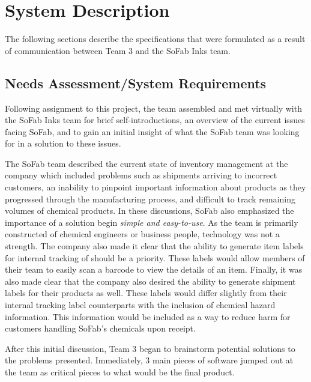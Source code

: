\documentclass{article}
\begin{document}
\section{System Description}
The following sections describe the specifications that were formulated as a result of communication between Team 3 and the SoFab Inks
team. 
\subsection{Needs Assessment\slash System Requirements}
Following assignment to this project, the team assembled and met virtually with the SoFab Inks team for brief self-introductions, 
an overview of the current issues facing SoFab, and to gain an initial insight of what the SoFab team was looking for in a
solution to these issues. 

The SoFab team described the current state of inventory management at the company which included problems such as shipments arriving 
to incorrect customers, an inability to pinpoint important information about products as they progressed through the manufacturing 
process, and difficult to track remaining volumes of chemical products. In these discussions, SoFab also emphasized the importance 
of a solution begin \textit{simple and easy-to-use}. As the team is primarily constructed of chemical engineers or business people, 
technology was not a strength. The company also made it clear that the ability to generate item labels for internal tracking of 
should be a priority. These labels would allow members of their team to easily scan a barcode to view the details of an item. Finally, 
it was also made clear that the company also desired the ability to generate shipment labels for their products as well. These labels 
would differ slightly from their internal tracking label counterparts with the inclusion of chemical hazard information. This information
would be included as a way to reduce harm for customers handling SoFab's chemicals upon receipt.

After this initial discussion, Team 3 began to brainstorm potential solutions to the problems presented. Immediately, 3 main 
pieces of software jumped out at the team as critical pieces to what would be the final product.
\end{document}
